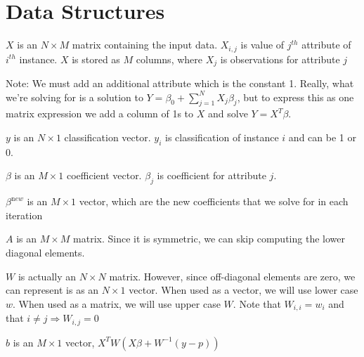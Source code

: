 \documentclass[12pt,timesnewroman,letterpaper]{article}
\begin{document}
\section{Data Structures}

\bi
\item \(X\) is an \(N \times M\) matrix containing the input data.
  \(X_{i, j}\) is value of \(j^{th}\) attribute of \(i^{th}\)
  instance. \(X\) is stored as \(M\) columns, where \(X_j\) is
  observations for attribute \(j\)

Note: We must add an additional attribute which is the constant 1. Really, what
we're solving for is a solution to $Y = \beta_0 + \sum_{j = 1}^N
X_j \beta_j$, but to express this as one matrix expression we add a column of 1s to
$X$ and solve $Y = X^T\beta$.

\item \(y\) is an \(N \times 1\) classification vector. \(y_i\) is
  classification of instance \(i\) and can be 1 or 0.
\item \(\beta\) is an \(M \times 1\) coefficient vector. \(\beta_j\)
  is coefficient for attribute \(j\). 
\item \(\beta^{\mathrm new}\) is an \(M \times 1\) vector, which are the new
  coefficients that we solve for in each iteration
\item \(A\) is an \(M \times M\) matrix. Since it is symmetric, we can skip
  computing the lower diagonal elements.
\item \(W\) is actually an \(N \times N\) matrix. However, since
  off-diagonal elements are zero, we can represent is as an \(N \times
  1\) vector.   When used as a vector, we will use lower case \(w\). When used
  as a matrix, we will use upper case \(W\). Note that \(W_{i, i} = w_i\) and
  that \( i \neq j \Rightarrow W_{i,j} = 0\)
\item \(b\) is an \(M \times 1\) vector, \(X^T W ( X \beta + W^{-1}(y - p) )\)
  \ei
\end{document}
